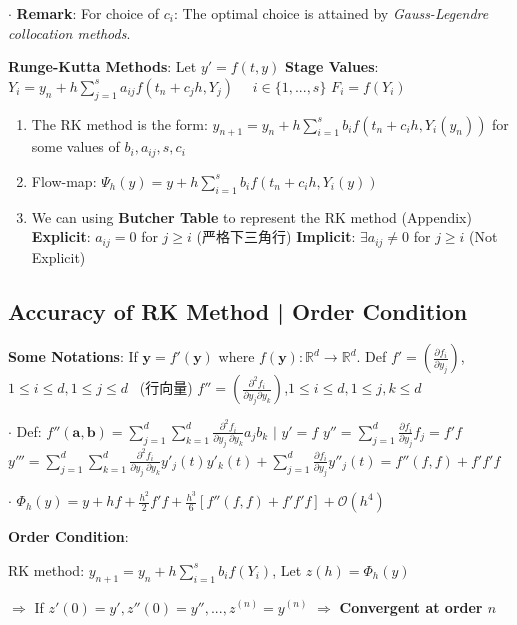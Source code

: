 \documentclass[9pt]{article}
\begin{document}
$\cdot$ \textbf{Remark}: {\footnotesize For choice of $c_i$: The optimal choice is attained by \textit{Gauss-Legendre collocation methods}}.

\textbf{Runge-Kutta Methods}: Let $y'=f(t,y)$ \quad \textbf{Stage Values}: $Y_i=y_n+h\sum_{j=1}^{s}a_{ij}f(t_n+c_jh,Y_{j})$ \ \ $i\in\{1,...,s\}$ \quad $F_i=f(Y_i)$

\begin{enumerate}[itemsep=-2pt, topsep=-2pt]
    \item The RK method is the form: $y_{n+1}=y_n+h\sum_{i=1}^{s}b_if(t_n+c_ih,Y_i(y_n))$ \quad for some values of $b_i,a_{ij},s,c_i$ 
    \item Flow-map: $\Psi_{h}(y)=y+h\sum_{i=1}^{s}b_if(t_n+c_ih,Y_i(y))$ \quad \quad {}
    \item \small{{ We can using \textbf{Butcher Table} to represent the RK method (Appendix)} \quad \textbf{Explicit}: $a_{ij}=0$ for $j\geq i$ { (严格下三角行)} \quad \textbf{Implicit}: $\exists a_{ij}\ne0$ for $j\geq i$ { (Not Explicit)}}
\end{enumerate}


\subsection{Accuracy of RK Method | Order Condition} %

\textbf{Some Notations}: If $\mathbf{y}=f'(\mathbf{y})$ where $f(\mathbf{y}):\mathbb{R}^d\to\mathbb{R}^d$. \quad Def $f'=(\frac{\partial f_i}{\partial y_j})$,{\scriptsize $1\leq i\leq d,1\leq j\leq d$} \ {\tiny (行向量)} \qquad $f''=(\frac{\partial^2 f_i}{\partial y_j\partial y_k})$,{\scriptsize $1\leq i\leq d,1\leq j,k\leq d$} 

$\cdot$ Def: {\footnotesize $f''(\mathbf{a},\mathbf{b})=\sum_{j=1}^{d}\sum_{k=1}^{d}\frac{\partial^2 f_i}{\partial y_{j} \ \partial y_{k}}a_jb_k$ \quad $\big|$ $y'=f$ \quad $y''=\sum_{j=1}^{d}\frac{\partial f_i}{\partial y_j}f_j=f'f$ \quad $y'''=\sum_{j=1}^{d}\sum_{k=1}^{d}\frac{\partial^2f_i}{\partial y_j \ \partial y_k}y'_j(t)y'_k(t)+\sum_{j=1}^{d}\frac{\partial f_i}{\partial y_j}y''_j(t)=f''(f,f)+f'f'f$}

$\cdot$ $\Phi_h(y)=y+hf+\frac{h^2}{2}f'f+\frac{h^3}{6}[f''(f,f)+f'f'f]+\mathcal{O}(h^4)$

\textbf{Order Condition}: {\small RK method: $y_{n+1}=y_n+h\sum_{i=1}^{s}b_if(Y_i)$, Let $z(h)=\Phi_h(y)$ 

\hspace{110pt} $\Rightarrow$ If $z'(0)=y',z''(0)=y'',...,z^{(n)}=y^{(n)}$ $\Rightarrow$ { \textbf{Convergent at order $n$}}}
\end{document}
